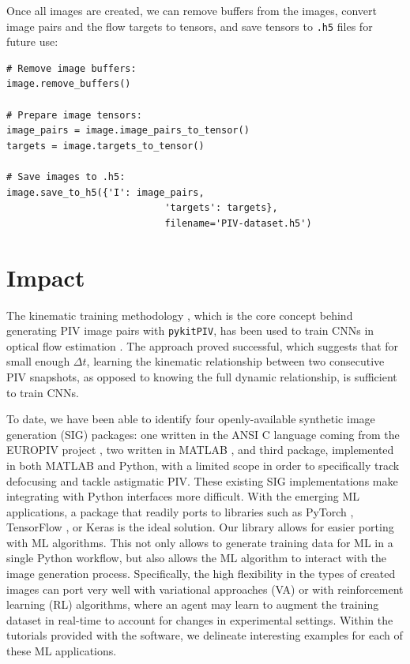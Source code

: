 \documentclass[a4paper,fleqn]{cas-dc}
\begin{document}
Once all images are created, we can remove buffers from the images, convert image pairs and the flow targets to tensors, and save tensors to \texttt{.h5} files for future use:
\lstset{language=Python}
\begin{lstlisting}
# Remove image buffers:
image.remove_buffers()

# Prepare image tensors:
image_pairs = image.image_pairs_to_tensor()
targets = image.targets_to_tensor()

# Save images to .h5:
image.save_to_h5({'I': image_pairs, 
							'targets': targets}, 
							filename='PIV-dataset.h5')
\end{lstlisting}

\section{Impact} \label{sec:results}

The kinematic training methodology \cite{manickathan2022kinematic}, which is the core concept behind generating PIV image pairs with \texttt{pykitPIV}, has been used to train CNNs in optical flow estimation \cite{manickathan2022kinematic, manickathan2023lightweight, mucignat2023lightweight}. The approach proved successful, which suggests that for small enough $\Delta t$, learning the kinematic relationship between two consecutive PIV snapshots, as opposed to knowing the full dynamic relationship, is sufficient to train CNNs.


To date, we have been able to identify four openly-available synthetic image generation (SIG) packages: one written in the ANSI C language coming from the EUROPIV project \cite{lecordier2004europiv}, two written in MATLAB \citep{ben2020openpiv, mendes2020piv}, and third package, implemented in both MATLAB and Python, with a limited scope in order to specifically track defocusing and tackle astigmatic PIV. These existing SIG implementations make integrating with Python interfaces more difficult. With the emerging ML applications, a package that readily ports to libraries such as PyTorch \cite{paszke2017automatic, paszke2019pytorch}, TensorFlow \cite{tensorflow2015}, or Keras \cite{chollet2015keras} is the ideal solution. Our library allows for easier porting with ML algorithms. This not only allows to generate training data for ML in a single Python workflow, but also allows the ML algorithm to interact with the image generation process. Specifically, the high flexibility in the types of created images can port very well with variational approaches (VA) or with reinforcement learning (RL) algorithms, where an agent may learn to augment the training dataset in real-time to account for changes in experimental settings. Within the tutorials provided with the software, we delineate interesting examples for each of these ML applications.
\end{document}
